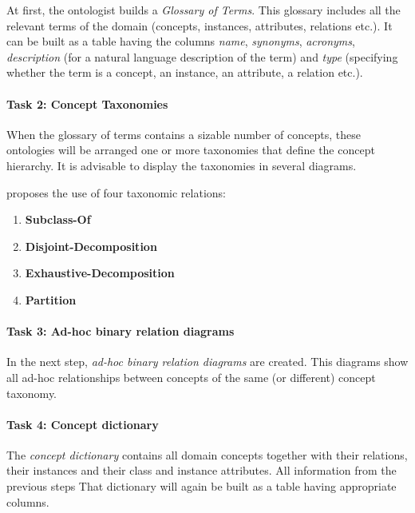 At first, the ontologist builds a \emph{Glossary of Terms}. This glossary includes all the relevant terms of the domain (concepts, instances, attributes, relations etc.). It can be built as a table having the columns \emph{name}, \emph{synonyms}, \emph{acronyms}, \emph{description} (for a natural language description of the term) and \emph{type} (specifying whether the term is a concept, an instance, an attribute, a relation etc.).

\paragraph{Task 2: Concept Taxonomies}

When the glossary of terms contains a sizable number of concepts, these ontologies will be arranged one or more taxonomies that define the concept hierarchy. It is advisable to display the taxonomies in several diagrams.

\methontology proposes the use of four taxonomic relations:
\begin{enumerate}
  \item \textbf{Subclass-Of}
  \item \textbf{Disjoint-Decomposition}
  \item \textbf{Exhaustive-Decomposition}
  \item \textbf{Partition}
\end{enumerate}


\paragraph{Task 3: Ad-hoc binary relation diagrams}

In the next step, \emph{ad-hoc binary relation diagrams} are created. This diagrams show all ad-hoc relationships between concepts of the same (or different) concept taxonomy.


\paragraph{Task 4: Concept dictionary}

The \emph{concept dictionary} contains all domain concepts together with their relations, their instances and their class and instance attributes. All information from the previous steps That dictionary will again be built as a table having appropriate columns.

